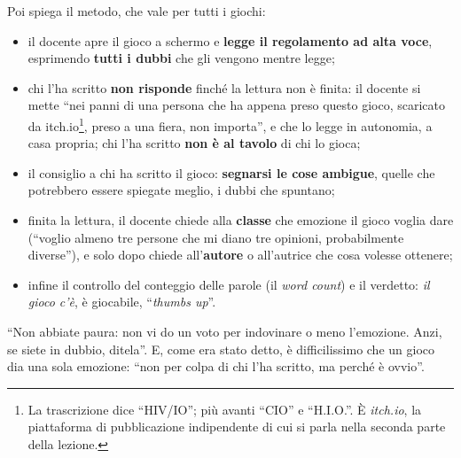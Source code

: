 Poi spiega il metodo, che vale per tutti i giochi:
\begin{itemize}
  \item il docente apre il gioco a schermo e \textbf{legge il regolamento ad alta
        voce}, esprimendo \textbf{tutti i dubbi} che gli vengono mentre legge;
  \item chi l'ha scritto \textbf{non risponde} finché la lettura non è finita: il
        docente si mette ``nei panni di una persona che ha appena preso questo
        gioco, scaricato da itch.io\footnote{La trascrizione dice ``HIV/IO''; più
        avanti ``CIO'' e ``H.I.O.''. È \emph{itch.io}, la piattaforma di
        pubblicazione indipendente di cui si parla nella seconda parte della
        lezione.}, preso a una fiera, non importa'', e che lo legge in autonomia, a
        casa propria; chi l'ha scritto \textbf{non è al tavolo} di chi lo gioca;
  \item il consiglio a chi ha scritto il gioco: \textbf{segnarsi le cose ambigue},
        quelle che potrebbero essere spiegate meglio, i dubbi che spuntano;
  \item finita la lettura, il docente chiede alla \textbf{classe} che emozione il
        gioco voglia dare (``voglio almeno tre persone che mi diano tre opinioni,
        probabilmente diverse''), e solo dopo chiede all'\textbf{autore} o
        all'autrice che cosa volesse ottenere;
  \item infine il controllo del conteggio delle parole (il \emph{word count}) e il
        verdetto: \emph{il gioco c'è}, è giocabile, ``\emph{thumbs up}''.
\end{itemize}
``Non abbiate paura: non vi do un voto per indovinare o meno l'emozione. Anzi, se
siete in dubbio, ditela''. E, come era stato detto, è difficilissimo che un gioco dia
una sola emozione: ``non per colpa di chi l'ha scritto, ma perché è ovvio''.

